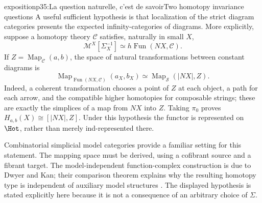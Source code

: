 \begin{dcomment}{exposition}{p35:La question naturelle, c'est de savoir}{Two homotopy invariance questions}
A useful sufficient hypothesis is that localization of the strict diagram categories presents the expected infinity-categories of diagrams. More explicitly, suppose a homotopy theory $\mathcal C$ satisfies, naturally in small $X$,
\[
 \mathcal M^X[\Sigma_X^{-1}]
   \simeq h\operatorname{Fun}(NX,\mathcal C).
\]
If $Z=\operatorname{Map}_{\mathcal C}(a,b)$, the space of natural transformations between constant diagrams is
\[
 \operatorname{Map}_{\operatorname{Fun}(NX,\mathcal C)}(a_X,b_X)
   \simeq\operatorname{Map}_{\mathcal S}(|NX|,Z).
\]
Indeed, a coherent transformation chooses a point of $Z$ at each object, a path for each arrow, and the compatible higher homotopies for composable strings; these are exactly the simplices of a map from $NX$ into $Z$. Taking $\pi_0$ proves $H_{a,b}(X)\cong[|NX|,Z]$. Under this hypothesis the functor is represented on $\Hot$, rather than merely ind-represented there.

Combinatorial simplicial model categories provide a familiar setting for this statement. The mapping space must be derived, using a cofibrant source and a fibrant target. The model-independent function-complex construction is due to Dwyer and Kan; their comparison theorem explains why the resulting homotopy type is independent of auxiliary model structures \citep[\S4]{DwyerKan1980Function}. The displayed hypothesis is stated explicitly here because it is not a consequence of an arbitrary choice of $\Sigma$.
\end{dcomment}


